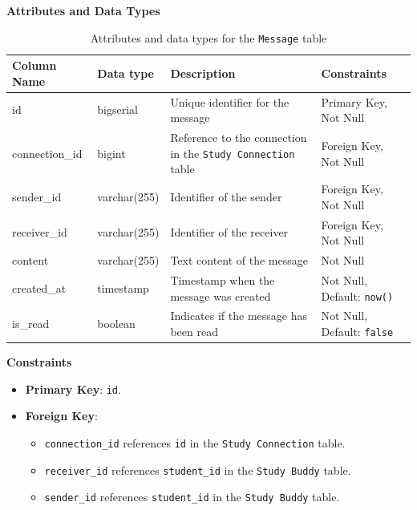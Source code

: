 \documentclass[12pt]{article}
\begin{document}
\textbf{Attributes and Data Types}
\begin{table}[H]
    \centering
    \renewcommand{\arraystretch}{1.5}
    \begin{tabular}{|l|l|p{4.5cm}|l|}
    \hline
    \rowcolor[HTML]{96FFFB} 
    \textbf{Column Name} & \textbf{Data type}        & \textbf{Description}                                   & \textbf{Constraints}             \\ \hline
    id                   & bigserial               & Unique identifier for the message                     & Primary Key, Not Null            \\ \hline
    connection\_id       & bigint                  & Reference to the connection in the \texttt{Study Connection} table & Foreign Key, Not Null           \\ \hline
    sender\_id           & varchar(255)            & Identifier of the sender                              & Foreign Key, Not Null            \\ \hline
    receiver\_id         & varchar(255)            & Identifier of the receiver                            & Foreign Key, Not Null            \\ \hline
    content              & varchar(255)            & Text content of the message                           & Not Null                         \\ \hline
    created\_at          & timestamp               & Timestamp when the message was created                & Not Null, Default: \texttt{now()} \\ \hline
    is\_read             & boolean                 & Indicates if the message has been read                & Not Null, Default: \texttt{false} \\ \hline
    \end{tabular}
    \caption{Attributes and data types for the \texttt{Message} table}
\end{table}

\noindent
\textbf{Constraints}
\begin{itemize}
    \item \textbf{Primary Key}: \texttt{id}.
    \item \textbf{Foreign Key}: 
    \begin{itemize}
        \item \texttt{connection\_id} references \texttt{id} in the \texttt{Study Connection} table.
        \item \texttt{receiver\_id} references \texttt{student\_id} in the \texttt{Study Buddy} table.
        \item \texttt{sender\_id} references \texttt{student\_id} in the \texttt{Study Buddy} table.
    \end{itemize}
\end{itemize}
\end{document}
